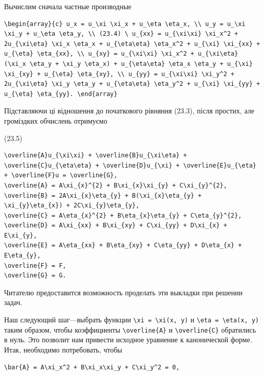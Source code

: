 \documentclass[
  ukrainian,
]{article}
\begin{document}
Вычислим сначала частные производные

\begin{verbatim}
\begin{array}{c} u_x = u_\xi \xi_x + u_\eta \eta_x, \\ u_y = u_\xi \xi_y + u_\eta \eta_y, \\ (23.4) \ u_{xx} = u_{\xi\xi} \xi_x^2 + 2u_{\xi\eta} \xi_x \eta_x + u_{\eta\eta} \eta_x^2 + u_{\xi} \xi_{xx} + u_{\eta} \eta_{xx}, \\ u_{xy} = u_{\xi\xi} \xi_x^2 + u_{\xi\eta} (\xi_x \eta_y + \xi_y \eta_x) + u_{\eta\eta} \eta_x \eta_y + u_{\xi} \xi_{xy} + u_{\eta} \eta_{xy}, \\ u_{yy} = u_{\xi\xi} \xi_y^2 + 2u_{\xi\eta} \xi_y \eta_y + u_{\eta\eta} \eta_y^2 + u_{\xi} \xi_{yy} + u_{\eta} \eta_{yy}. \end{array}
\end{verbatim}

Підставляючи ці відношення до початкового рівняння (23.3), після
простих, але громіздких обчислень отримуємо

(23.5)

\begin{verbatim}
\overline{A}u_{\xi\xi} + \overline{B}u_{\xi\eta} + \overline{C}u_{\eta\eta} + \overline{D}u_{\xi} + \overline{E}u_{\eta} + \overline{F}u = \overline{G},
\overline{A} = A\xi_{x}^{2} + B\xi_{x}\xi_{y} + C\xi_{y}^{2},
\overline{B} = 2A\xi_{x}\eta_{y} + B(\xi_{x}\eta_{y} + \xi_{y}\eta_{x}) + 2C\xi_{y}\eta_{y},
\overline{C} = A\eta_{x}^{2} + B\eta_{x}\eta_{y} + C\eta_{y}^{2},
\overline{D} = A\xi_{xx} + B\xi_{xy} + C\xi_{yy} + D\xi_{x} + E\xi_{y},
\overline{E} = A\eta_{xx} + B\eta_{xy} + C\eta_{yy} + D\eta_{x} + E\eta_{y},
\overline{F} = F,
\overline{G} = G.
\end{verbatim}

Читателю предоставится возможность проделать эти выкладки при решении
задач.

Наш следующий шаг---выбрать функции
\texttt{\textbackslash{}xi\ =\ \textbackslash{}xi(x,\ y)} и
\texttt{\textbackslash{}eta\ =\ \textbackslash{}eta(x,\ y)} таким
образом, чтобы коэффициенты \texttt{\textbackslash{}overline\{A\}} и
\texttt{\textbackslash{}overline\{C\}} обратились в нуль. Это позволит
нам привести исходное уравиение к канонической форме. Итак, необходимо
потребовать, чтобы

\begin{verbatim}
\bar{A} = A\xi_x^2 + B\xi_x\xi_y + C\xi_y^2 = 0,
\end{verbatim}
\end{document}
